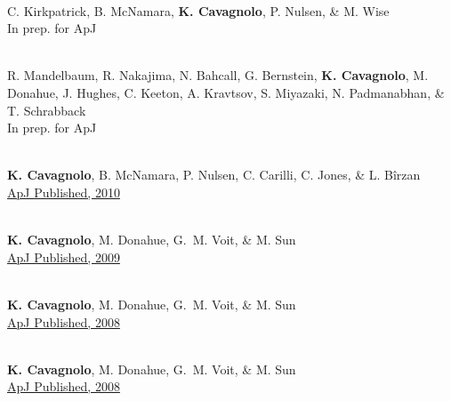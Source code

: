 \documentclass[11pt]{cv}
\begin{document}
\begin{llist}
{}\\
C. Kirkpatrick, B. McNamara, {\bf K. Cavagnolo}, P. Nulsen, \& M. Wise\\
In prep. for ApJ

{}\\
R. Mandelbaum, R. Nakajima, N. Bahcall, G. Bernstein, {\bf K. Cavagnolo}, M. Donahue, J. Hughes, C. Keeton, A. Kravtsov, S. Miyazaki, N. Padmanabhan, \& T. Schrabback\\
In prep. for ApJ



{}\\
{\bf K. Cavagnolo}, B. McNamara, P. Nulsen, C. Carilli, C. Jones, \& L. B\^irzan\\
\href{http://adsabs.harvard.edu/abs/2010ApJ...720.1066C}{ApJ Published, 2010}

{}\\
{\bf K. Cavagnolo}, M. Donahue, G.~M. Voit, \& M. Sun\\
\href{http://adsabs.harvard.edu/abs/2009ApJS..182...12C}{ApJ Published, 2009}

{}\\
{\bf K. Cavagnolo}, M. Donahue, G.~M. Voit, \& M. Sun\\
\href{http://adsabs.harvard.edu/abs/2008ApJ...683L.107C}{ApJ Published, 2008}

{}\\
{\bf K. Cavagnolo}, M. Donahue, G.~M. Voit, \& M. Sun\\
\href{http://adsabs.harvard.edu/abs/2008ApJ...682..821C}{ApJ Published, 2008}



\end{llist}
\end{document}
